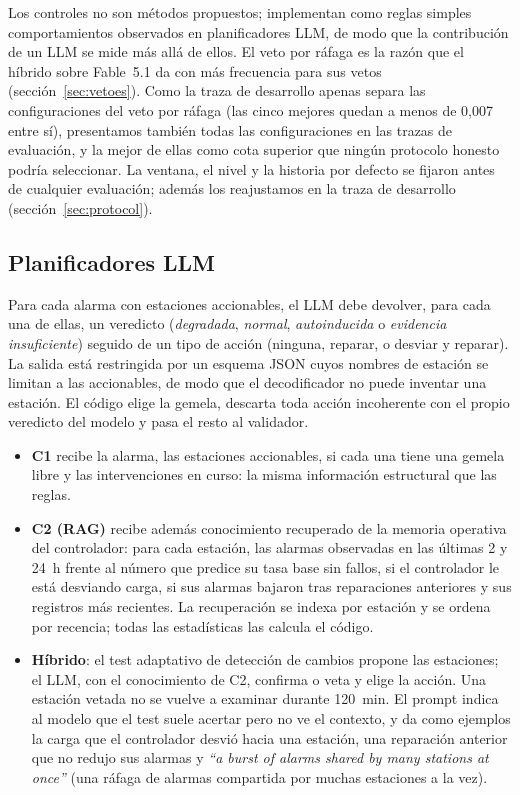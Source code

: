 \documentclass[preprint,11pt]{elsarticle}
\begin{document}
Los controles no son métodos propuestos; implementan como reglas simples comportamientos observados en planificadores LLM, de modo que la contribución de un LLM se mide más allá de ellos. El veto por ráfaga es la razón que el híbrido sobre Fable~5.1 da con más frecuencia para sus vetos (sección~\ref{sec:vetoes}). Como la traza de desarrollo apenas separa las configuraciones del veto por ráfaga (las cinco mejores quedan a menos de 0{,}007 entre sí), presentamos también todas las configuraciones en las trazas de evaluación, y la mejor de ellas como cota superior que ningún protocolo honesto podría seleccionar. La ventana, el nivel y la historia por defecto se fijaron antes de cualquier evaluación; además los reajustamos en la traza de desarrollo (sección~\ref{sec:protocol}).

\subsection{Planificadores LLM}
Para cada alarma con estaciones accionables, el LLM debe devolver, para cada una de ellas, un veredicto (\emph{degradada}, \emph{normal}, \emph{autoinducida} o \emph{evidencia insuficiente}) seguido de un tipo de acción (ninguna, reparar, o desviar y reparar). La salida está restringida por un esquema JSON cuyos nombres de estación se limitan a las accionables, de modo que el decodificador no puede inventar una estación. El código elige la gemela, descarta toda acción incoherente con el propio veredicto del modelo y pasa el resto al validador.
\begin{itemize}
  \item \textbf{C1} recibe la alarma, las estaciones accionables, si cada una tiene una gemela libre y las intervenciones en curso: la misma información estructural que las reglas.
  \item \textbf{C2 (RAG)} recibe además conocimiento recuperado de la memoria operativa del controlador: para cada estación, las alarmas observadas en las últimas 2 y 24~h frente al número que predice su tasa base sin fallos, si el controlador le está desviando carga, si sus alarmas bajaron tras reparaciones anteriores y sus registros más recientes. La recuperación se indexa por estación y se ordena por recencia; todas las estadísticas las calcula el código.
  \item \textbf{Híbrido}: el test adaptativo de detección de cambios propone las estaciones; el LLM, con el conocimiento de C2, confirma o veta y elige la acción. Una estación vetada no se vuelve a examinar durante 120~min. El prompt indica al modelo que el test suele acertar pero no ve el contexto, y da como ejemplos la carga que el controlador desvió hacia una estación, una reparación anterior que no redujo sus alarmas y \emph{``a burst of alarms shared by many stations at once''} (una ráfaga de alarmas compartida por muchas estaciones a la vez).
\end{itemize}
\end{document}
